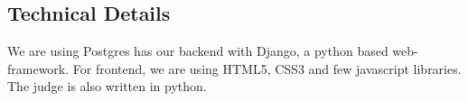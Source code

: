 \documentclass{article}
\begin{document}
\subsection{Technical Details}
We are using Postgres has our backend with Django, a python based web-framework. For frontend, we are using HTML5, CSS3 and few javascript libraries. The judge is also written in python.











\end{document}
